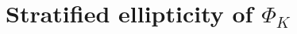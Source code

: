 \documentclass[10pt]{amsart}
\theoremstyle{remark}
\begin{document}
\section{Stratified ellipticity of $\Phi_K$}\label{sec-stra}

\end{document}
